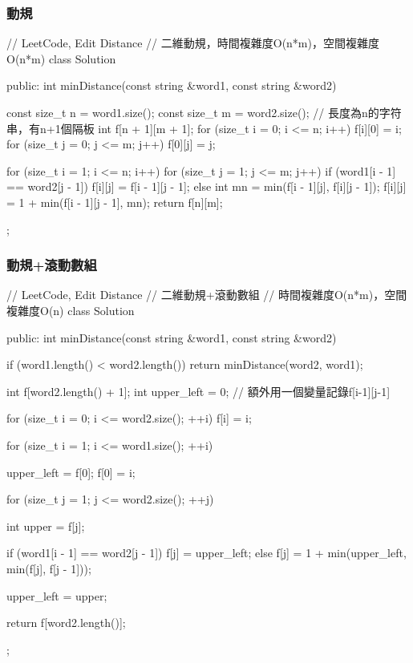 \subsubsection{動規}
\begin{Code}
// LeetCode, Edit Distance
// 二維動規，時間複雜度O(n*m)，空間複雜度O(n*m)
class Solution {
public:
    int minDistance(const string &word1, const string &word2) {
        const size_t n = word1.size();
        const size_t m = word2.size();
        // 長度為n的字符串，有n+1個隔板
        int f[n + 1][m + 1];
        for (size_t i = 0; i <= n; i++)
            f[i][0] = i;
        for (size_t j = 0; j <= m; j++)
            f[0][j] = j;

        for (size_t i = 1; i <= n; i++) {
            for (size_t j = 1; j <= m; j++) {
                if (word1[i - 1] == word2[j - 1])
                    f[i][j] = f[i - 1][j - 1];
                else {
                    int mn = min(f[i - 1][j], f[i][j - 1]);
                    f[i][j] = 1 + min(f[i - 1][j - 1], mn);
                }
            }
        }
        return f[n][m];
    }
};
\end{Code}


\subsubsection{動規+滾動數組}
\begin{Code}
// LeetCode, Edit Distance
// 二維動規+滾動數組
// 時間複雜度O(n*m)，空間複雜度O(n)
class Solution {
public:
    int minDistance(const string &word1, const string &word2) {
        if (word1.length() < word2.length())
            return minDistance(word2, word1);

        int f[word2.length() + 1];
        int upper_left = 0; // 額外用一個變量記錄f[i-1][j-1]

        for (size_t i = 0; i <= word2.size(); ++i)
            f[i] = i;

        for (size_t i = 1; i <= word1.size(); ++i) {
            upper_left = f[0];
            f[0] = i;

            for (size_t j = 1; j <= word2.size(); ++j) {
                int upper = f[j];

                if (word1[i - 1] == word2[j - 1])
                    f[j] = upper_left;
                else
                    f[j] = 1 + min(upper_left, min(f[j], f[j - 1]));

                upper_left = upper;
            }
        }

        return f[word2.length()];
    }
};
\end{Code}


